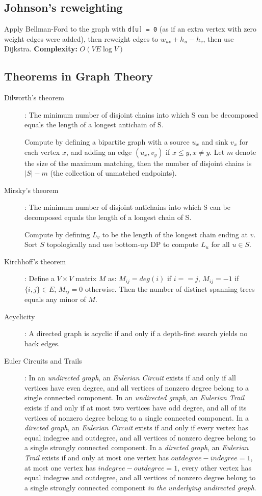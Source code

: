 \documentclass[
	a4paper,
	landscape,
	10pt,
	article
]{article}
\begin{document}
\subsection{Johnson's reweighting}
Apply Bellman-Ford to the graph with \texttt{d[u] = 0} (as if an extra vertex with zero weight edges were added), then reweight edges to $w_{uv} + h_u - h_v$, then use Dijkstra.
\noindent\textbf{Complexity:} $O(VE \log V)$

\subsection{Theorems in Graph Theory}
\begin{description}
	\item[Dilworth's theorem]:
		The minimum number of disjoint chains into which S can be decomposed equals the length of a longest antichain of S.

		Compute by defining a bipartite graph with a source $u_x$ and sink $v_x$ for each vertex $x$, and adding an edge $(u_x, v_y)$ if $x \leq y, x \neq y$. Let $m$ denote the size of the maximum matching, then the number of disjoint chains is $|S| - m$ (the collection of unmatched endpoints).

	\item[Mirsky's theorem]:
		The minimum number of disjoint antichains into which S can be decomposed equals the length of a longest chain of S.

		Compute by defining $L_v$ to be the length of the longest chain ending at $v$. Sort $S$ topologically and use bottom-up DP to compute $L_u$ for all $u \in S$.

	\item[Kirchhoff's theorem]:
		Define a $V \times V$ matrix $M$ as: $M_{ij} = deg(i)$ if $i == j$, $M_{ij} = - 1$ if $\{i, j\} \in E$, $M_{ij} = 0$ otherwise. Then the number of distinct spanning trees equals any minor of $M$.

	\item[Acyclicity]:
		A directed graph is acyclic if and only if a depth-first search yields no back edges.

	\item[Euler Circuits and Trails]:
		In an \textit{undirected graph}, an \textit{Eulerian Circuit} exists if and only if all vertices have even degree, and all vertices of nonzero degree belong to a single connected component. In an \textit{undirected graph}, an \textit{Eulerian Trail} exists if and only if at most two vertices have odd degree, and all of its vertices of nonzero degree belong to a single connected component. In a \textit{directed graph}, an \textit{Eulerian Circuit} exists if and only if every vertex has equal indegree and outdegree, and all vertices of nonzero degree belong to a single strongly connected component. In a \textit{directed graph}, an \textit{Eulerian Trail} exists if and only at most one vertex has $outdegree - indegree = 1$, at most one vertex has $indegree - outdegree = 1$, every other vertex has equal indegree and outdegree, and all vertices of nonzero degree belong to a single strongly connected component \textit{in the underlying undirected graph}.
\end{description}
\end{document}
